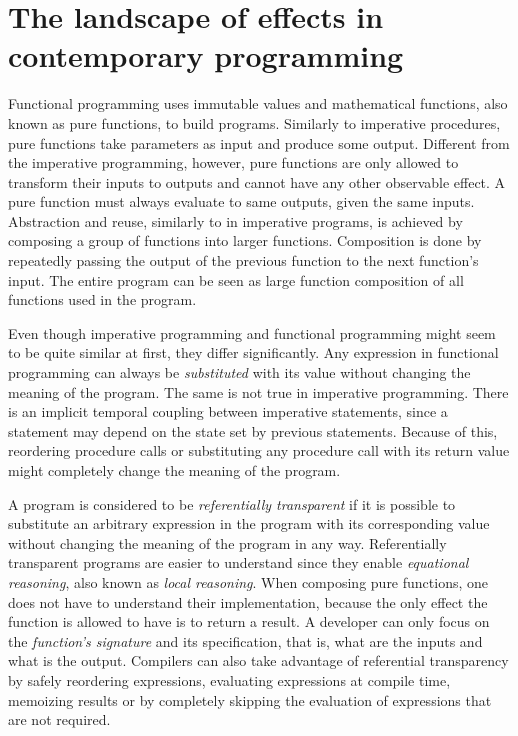 \chapter{The landscape of effects in contemporary programming}


Functional programming uses immutable values and mathematical functions, also known as pure functions, to build programs. Similarly to imperative procedures, pure functions take parameters as input and produce some output. Different from the imperative programming, however, pure functions are only allowed to transform their inputs to outputs and cannot have any other observable effect. A pure function must always evaluate to same outputs, given the same inputs. Abstraction and reuse, similarly to in imperative programs, is achieved by composing a group of functions into larger functions. Composition is done by repeatedly passing the output of the previous function to the next function's input. The entire program can be seen as large function composition of all functions used in the program.

Even though imperative programming and functional programming might seem to be quite similar at first, they differ significantly. Any expression in functional programming can always be \textit{substituted} with its value without changing the meaning of the program. The same is not true in imperative programming. There is an implicit temporal coupling between imperative statements, since a statement may depend on the state set by previous statements. Because of this, reordering procedure calls or substituting any procedure call with its return value might completely change the meaning of the program.~\cite[Chapter~1]{sicp}

A program is considered to be \textit{referentially transparent} if it is possible to substitute an arbitrary expression in the program with its corresponding value without changing the meaning of the program in any way. Referentially transparent programs are easier to understand since they enable \textit{equational reasoning}, also known as \textit{local reasoning}. When composing pure functions, one does not have to understand their implementation, because the only effect the function is allowed to have is to return a result. A developer can only focus on the \textit{function's signature} and its specification, that is, what are the inputs and what is the output. Compilers can also take advantage of referential transparency by safely reordering expressions, evaluating expressions at compile time, memoizing results or by completely skipping the evaluation of expressions that are not required.

